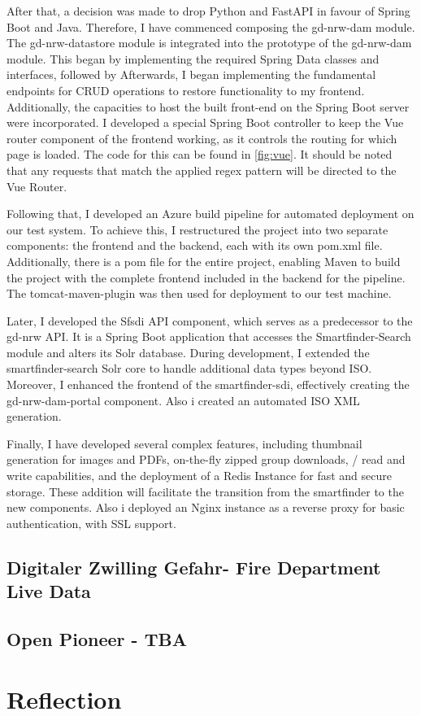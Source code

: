 \documentclass[11pt, titlepage, a4paper]{article}
\begin{document}
After that, a decision was made to drop Python and FastAPI in favour of Spring Boot and Java. Therefore, I have commenced composing the gd-nrw-dam module. The gd-nrw-datastore module is integrated into the prototype of the gd-nrw-dam module. This began by implementing the required Spring Data classes and interfaces, followed by Afterwards, I began implementing the fundamental endpoints for CRUD operations to restore functionality to my frontend. Additionally, the capacities to host the built front-end on the Spring Boot server were incorporated. I developed a special Spring Boot controller to keep the Vue router component of the frontend working, as it controls the routing for which page is loaded. The code for this can be found in \ref{fig:vue}. It should be noted that any requests that match the applied regex pattern will be directed to the Vue Router.

Following that, I developed an Azure build pipeline for automated deployment on our test system.  To achieve this, I restructured the project into two separate components: the frontend and the backend, each with its own pom.xml file. Additionally, there is a pom file for the entire project, enabling Maven to build the project with the complete frontend included in the backend for the pipeline. The tomcat-maven-plugin was then used for deployment to our test machine.

Later, I developed the Sfsdi API component, which serves as a predecessor to the gd-nrw API. It is a Spring Boot application that accesses the Smartfinder-Search module and alters its Solr database. During development, I extended the smartfinder-search Solr core to handle additional data types beyond ISO. Moreover, I enhanced the frontend of the smartfinder-sdi, effectively creating the gd-nrw-dam-portal component.
Also i created an automated ISO XML generation.

Finally, I have developed several complex features, including thumbnail generation for images and PDFs, on-the-fly zipped group downloads, / read and write capabilities, and the deployment of a Redis Instance for fast and secure storage. These addition will facilitate the transition from the smartfinder to the new components. Also i deployed an Nginx instance as a reverse proxy for basic authentication, with SSL support. 



\subsection{Digitaler Zwilling Gefahr- Fire Department Live Data}
\subsection{Open Pioneer - TBA}
\section{Reflection}

\clearpage
\printglossary[type=\acronymtype]
\printglossary
\clearpage
\printbibliography
\end{document}
